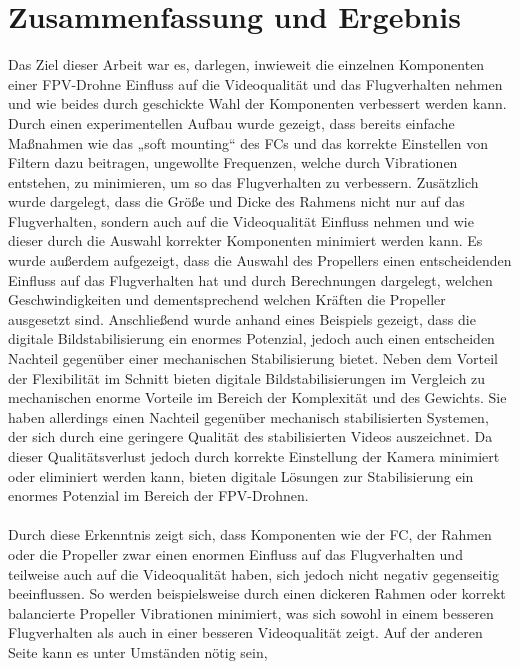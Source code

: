 
\section[Zusammenfassung und Ergebnis]{Zusammenfassung und Ergebnis}
Das Ziel dieser Arbeit war es, darlegen, inwieweit die einzelnen Komponenten einer FPV-Drohne
Einfluss auf die Videoqualität und das Flugverhalten nehmen und wie beides durch geschickte Wahl
der Komponenten verbessert werden kann. Durch einen experimentellen Aufbau wurde gezeigt, dass
bereits einfache Maßnahmen wie das „soft mounting“ des FCs und das korrekte Einstellen von Filtern
dazu beitragen, ungewollte Frequenzen, welche durch Vibrationen entstehen, zu minimieren, um so
das Flugverhalten zu verbessern. Zusätzlich wurde dargelegt, dass die Größe und Dicke des Rahmens
nicht nur auf das Flugverhalten, sondern auch auf die Videoqualität Einfluss nehmen und wie dieser
durch die Auswahl korrekter Komponenten minimiert werden kann. Es wurde außerdem aufgezeigt, dass
die Auswahl des Propellers einen entscheidenden Einfluss auf das Flugverhalten hat und durch
Berechnungen dargelegt, welchen Geschwindigkeiten und dementsprechend welchen Kräften die Propeller
ausgesetzt sind. Anschließend wurde anhand eines Beispiels gezeigt, dass die digitale
Bildstabilisierung ein enormes Potenzial, jedoch auch einen entscheiden Nachteil gegenüber einer
mechanischen Stabilisierung bietet. Neben dem Vorteil der Flexibilität im Schnitt bieten digitale
Bildstabilisierungen im Vergleich zu mechanischen enorme Vorteile im Bereich der Komplexität und
des Gewichts. Sie haben allerdings einen Nachteil gegenüber mechanisch stabilisierten Systemen,
der sich durch eine geringere Qualität des stabilisierten Videos auszeichnet. Da dieser Qualitätsverlust
jedoch durch korrekte Einstellung der Kamera minimiert oder eliminiert werden kann, bieten digitale
Lösungen zur Stabilisierung ein enormes Potenzial im Bereich der FPV-Drohnen. \\
\\
Durch diese Erkenntnis zeigt sich, dass Komponenten wie der FC, der Rahmen oder die Propeller zwar
einen enormen Einfluss auf das Flugverhalten und teilweise auch auf die Videoqualität haben, sich
jedoch nicht negativ gegenseitig beeinflussen. So werden beispielsweise durch einen dickeren Rahmen
oder korrekt balancierte Propeller Vibrationen minimiert, was sich sowohl in einem besseren Flugverhalten
als auch in einer besseren Videoqualität zeigt. Auf der anderen Seite kann es unter Umständen nötig sein,
